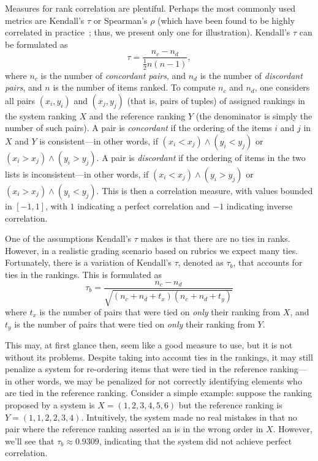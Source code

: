 Measures for rank correlation are plentiful. Perhaps the most commonly
used metrics are Kendall's $\tau$ or Spearman's $\rho$ (which have been
found to be highly correlated in practice~\cite{Shani:2011:Springer}; thus,
we present only one for illustration). Kendall's $\tau$ can be formulated
as
\[
    \tau = \frac{n_c - n_d}{\frac{1}{2} n (n-1)},
\]
where $n_c$ is the number of \emph{concordant pairs}, and $n_d$ is the number
of \emph{discordant pairs}, and $n$ is the number of items ranked. To
compute $n_c$ and $n_d$, one considers all pairs $(x_i, y_i)$ and $(x_j,
y_j)$ (that is, pairs of tuples) of assigned rankings in the system ranking
$X$ and the reference ranking $Y$ (the denominator is simply the number of
such pairs). A pair is \emph{concordant} if the ordering of the items $i$
and $j$ in $X$ and $Y$ is consistent---in other words, if $(x_i < x_j)
\land (y_i < y_j)$ or $(x_i > x_j) \land (y_i > y_j)$.  A pair is
\emph{discordant} if the ordering of items in the two lists is
inconsistent---in other words, if $(x_i < x_j) \land (y_i > y_j)$ or $(x_i
> x_j) \land (y_i < y_j)$. This is then a correlation measure, with values
bounded in $[-1, 1]$, with $1$ indicating a perfect correlation and $-1$
indicating inverse correlation.

One of the assumptions Kendall's $\tau$ makes is that there are no ties in
ranks. However, in a realistic grading scenario based on rubrics we expect
many ties. Fortunately, there is a variation of Kendall's $\tau$, denoted
as $\tau_b$, that accounts for ties in the rankings. This is formulated as
\[
    \tau_b = \frac{n_c - n_d}{\sqrt{(n_c + n_d + t_x)(n_c + n_d + t_y)}}
\]
where $t_x$ is the number of pairs that were tied on \emph{only} their
ranking from $X$, and $t_y$ is the number of pairs that were tied on
\emph{only} their ranking from $Y$.

This may, at first glance then, seem like a good measure to use, but it is
not without its problems. Despite taking into account ties in the rankings,
it may still penalize a system for re-ordering items that were tied in the
reference ranking---in other words, we may be penalized for not correctly
identifying elements who are tied in the reference ranking. Consider a
simple example: suppose the ranking proposed by a system is $X =
(1,2,3,4,5,6)$ but the reference ranking is $Y = (1,1,2,2,3,4)$.
Intuitively, the system made no real mistakes in that no pair where the
reference ranking asserted an is in the wrong order in $X$. However, we'll
see that $\tau_b \approx 0.9309$, indicating that the system did not achieve
perfect correlation.


